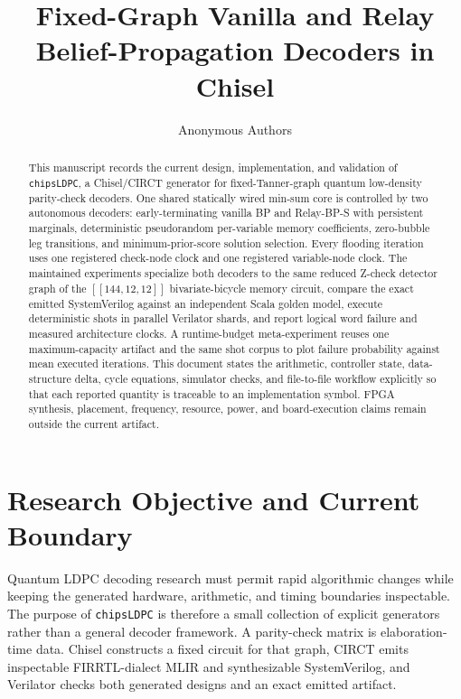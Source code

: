 \documentclass[10pt,conference]{IEEEtran}
\title{Fixed-Graph Vanilla and Relay Belief-Propagation Decoders in Chisel}
\author{Anonymous Authors}
\begin{document}
\maketitle

\begin{abstract}
This manuscript records the current design, implementation, and validation of
\texttt{chipsLDPC}, a Chisel/CIRCT generator for fixed-Tanner-graph quantum
low-density parity-check decoders.  One shared statically wired min-sum core is
controlled by two autonomous decoders: early-terminating vanilla BP and
Relay-BP-S with persistent marginals, deterministic pseudorandom per-variable memory
coefficients, zero-bubble leg transitions, and minimum-prior-score solution
selection.  Every flooding iteration uses one registered check-node clock and
one registered variable-node clock.  The maintained experiments specialize
both decoders to the same reduced Z-check detector graph of the
$[[144,12,12]]$ bivariate-bicycle memory circuit, compare the exact emitted
SystemVerilog against an independent Scala golden model, execute deterministic
shots in parallel Verilator shards, and report logical word failure and
measured architecture clocks.  A runtime-budget meta-experiment reuses one
maximum-capacity artifact and the same shot corpus to plot failure probability
against mean executed iterations.  This document states the arithmetic,
controller state, data-structure delta, cycle equations, simulator checks, and
file-to-file workflow explicitly so that each reported quantity is traceable to
an implementation symbol.  FPGA synthesis, placement, frequency, resource,
power, and board-execution claims remain outside the current artifact.
\end{abstract}

\section{Research Objective and Current Boundary}
Quantum LDPC decoding research must permit rapid algorithmic changes while
keeping the generated hardware, arithmetic, and timing boundaries inspectable.
The purpose of \texttt{chipsLDPC} is therefore a small collection of explicit
generators rather than a general decoder framework.  A parity-check matrix is
elaboration-time data.  Chisel constructs a fixed circuit for that graph,
CIRCT emits inspectable FIRRTL-dialect MLIR and synthesizable SystemVerilog, and
Verilator checks both generated designs and an exact emitted artifact.
\end{document}
